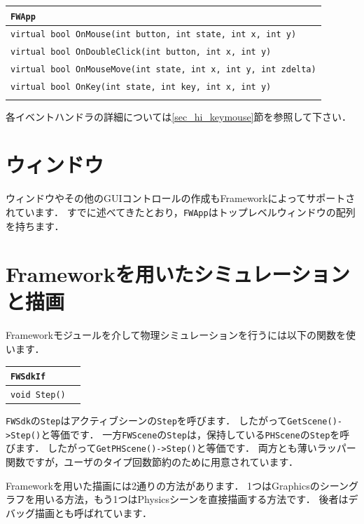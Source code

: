 \noindent
\begin{tabular}{p{1.0\hsize}}
\\
\texttt{FWApp}							\\ \midrule
\texttt{virtual bool OnMouse(int button, int state, int x, int y)}	\\
\texttt{virtual bool OnDoubleClick(int button, int x, int y)}	\\
\texttt{virtual bool OnMouseMove(int state, int x, int y, int zdelta)}	\\
\texttt{virtual bool OnKey(int state, int key, int x, int y)}	\\
\\
\end{tabular}

\KLUDGE 各イベントハンドラの詳細については\ref{sec_hi_keymouse}節を参照して下さい．

\section{ウィンドウ}

\KLUDGE ウィンドウやその他のGUIコントロールの作成もFrameworkによってサポートされています．
\KLUDGE すでに述べてきたとおり，\texttt{FWApp}はトップレベルウィンドウの配列を持ちます．




\section{Frameworkを用いたシミュレーションと描画}

Frameworkモジュールを介して物理シミュレーションを行うには以下の関数を使います．

\noindent
\begin{tabular}{p{.7\hsize}p{.2\hsize}}
\\
\texttt{FWSdkIf}			\\ \midrule
\texttt{void Step()}	& 	\\
\end{tabular}
\noindent

\texttt{FWSdk}の\texttt{Step}はアクティブシーンの\texttt{Step}を呼びます．
\KLUDGE したがって\texttt{GetScene()->Step()}と等価です．
\KLUDGE 一方\texttt{FWScene}の\texttt{Step}は，保持している\texttt{PHScene}の\texttt{Step}を呼びます．
\KLUDGE したがって\texttt{GetPHScene()->Step()}と等価です．
\KLUDGE 両方とも薄いラッパー関数ですが，ユーザのタイプ回数節約のために用意されています．

Frameworkを用いた描画には2通りの方法があります．
1つはGraphicsのシーングラフを用いる方法，もう1つはPhysicsシーンを直接描画する方法です．
\KLUDGE 後者はデバッグ描画とも呼ばれています．

